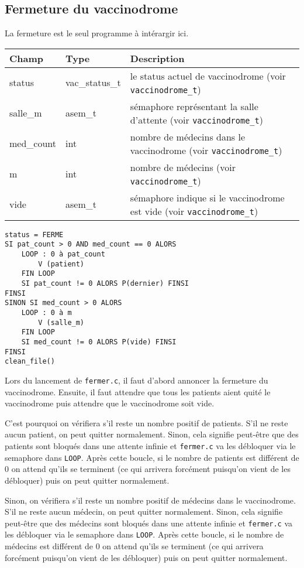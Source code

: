 \documentclass[a4paper]{article}
\begin{document}
\subsection{Fermeture du vaccinodrome}

La fermeture est le seul programme à intérargir ici.
\bigskip \newline
\begin{tabularx}{\linewidth}{|l|l|>{\strut}X|}
  \hline%
  Champ & Type & Description \\ \hline%
  status & vac\_status\_t & le status actuel de vaccinodrome (voir \texttt{vaccinodrome\_t}) \\ \hline%
  salle\_m & asem\_t & sémaphore représentant la salle d'attente (voir \texttt{vaccinodrome\_t}) \\ \hline%
  med\_count & int & nombre de médecins dans le vaccinodrome (voir \texttt{vaccinodrome\_t}) \\ \hline%
  m & int & nombre de médecins (voir \texttt{vaccinodrome\_t}) \\ \hline%
  vide & asem\_t & sémaphore indique si le vaccinodrome est vide (voir \texttt{vaccinodrome\_t}) \\ \hline%
\end{tabularx}

\begin{verbatim}
status = FERME
SI pat_count > 0 AND med_count == 0 ALORS
    LOOP : 0 à pat_count
        V (patient)
    FIN LOOP
    SI pat_count != 0 ALORS P(dernier) FINSI
FINSI
SINON SI med_count > 0 ALORS
    LOOP : 0 à m
        V (salle_m)
    FIN LOOP
    SI med_count != 0 ALORS P(vide) FINSI
FINSI
clean_file()
\end{verbatim}

\medskip \par
Lors du lancement de \texttt{fermer.c}, il faut d'abord annoncer la fermeture du vaccinodrome. Ensuite, il faut attendre que tous les patients aient quité le vaccinodrome puis attendre que le vaccinodrome soit vide. 
\medskip \par C'est pourquoi on vérifiera s'il reste un nombre positif de patients. S'il ne reste aucun patient, on peut quitter normalement. Sinon, cela signifie peut-être que des patients sont bloqués dans une attente infinie et \texttt{fermer.c} va les débloquer via le semaphore dans \texttt{LOOP}. Après cette boucle, si le nombre de patients est différent de 0 on attend qu'ils se terminent (ce qui arrivera forcément puisqu'on vient de les débloquer) puis on peut quitter normalement.
\medskip \par Sinon, on vérifiera s’il reste un nombre positif de médecins dans le vaccinodrome. S'il ne reste aucun médecin, on peut quitter normalement. Sinon, cela signifie peut-être que des médecins sont bloqués dans une attente infinie et \texttt{fermer.c} va les débloquer via le semaphore dans \texttt{LOOP}. Après cette boucle, si le nombre de médecins est différent de 0 on attend qu'ils se terminent (ce qui arrivera forcément puisqu'on vient de les débloquer) puis on peut quitter normalement.
\end{document}

